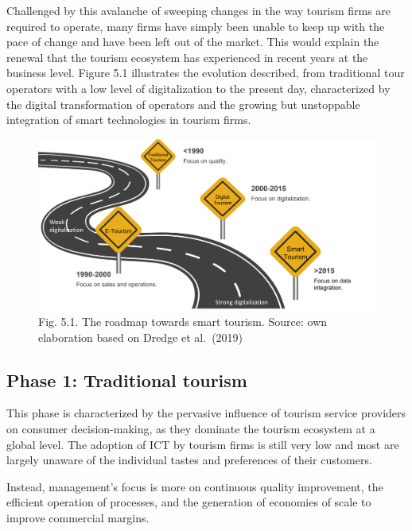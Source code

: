 \documentclass[
  letterpaper,
  DIV=11,
  numbers=noendperiod]{scrreprt}
\begin{document}
Challenged by this avalanche of sweeping changes in the way tourism
firms are required to operate, many firms have simply been unable to
keep up with the pace of change and have been left out of the market.
This would explain the renewal that the tourism ecosystem has
experienced in recent years at the business level. Figure 5.1
illustrates the evolution described, from traditional tour operators
with a low level of digitalization to the present day, characterized by
the digital transformation of operators and the growing but unstoppable
integration of smart technologies in tourism firms.

\begin{figure}

{\centering \includegraphics{img/fig1.png}

}

\caption{Fig. 5.1. The roadmap towards smart tourism. Source: own
elaboration based on Dredge et al.~(2019)}

\end{figure}

\hypertarget{phase-1-traditional-tourism}{%
\subsection{Phase 1: Traditional
tourism}\label{phase-1-traditional-tourism}}

This phase is characterized by the pervasive influence of tourism
service providers on consumer decision-making, as they dominate the
tourism ecosystem at a global level. The adoption of ICT by tourism
firms is still very low and most are largely unaware of the individual
tastes and preferences of their customers.

Instead, management's focus is more on continuous quality improvement,
the efficient operation of processes, and the generation of economies of
scale to improve commercial margins.
\end{document}
